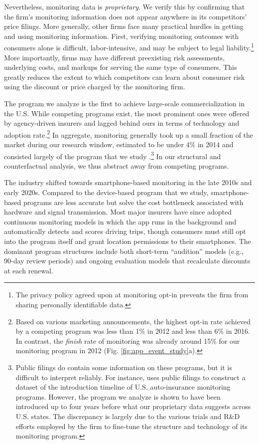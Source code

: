 Nevertheless, monitoring data is \emph{proprietary}. We verify this by confirming that the firm's monitoring information does not appear anywhere in its competitors' price filings. More generally, other firms face many practical hurdles in getting and using monitoring information. First, verifying monitoring outcomes with consumers alone is difficult, labor-intensive, and may be subject to legal liability.\footnote{The privacy policy agreed upon at monitoring opt-in prevents the firm from sharing personally identifiable data.} More importantly, firms may have different preexisting risk assessments, underlying costs, and markups for serving the same type of consumers. This greatly reduces the extent to which competitors can learn about consumer risk using the discount or price charged by the monitoring firm.

The program we analyze is the first to achieve large-scale commercialization in the U.S. While competing programs exist, the most prominent ones were offered by agency-driven insurers and lagged behind ours in terms of technology and adoption rate.\footnote{Based on various marketing announcements, the highest opt-in rate achieved by a competing program was less than 1\% in 2012 and less than 6\% in 2016. In contrast, the \textit{finish} rate of monitoring was already around 15\% for our monitoring program in 2012 (Fig. \ref{fig:app_event_study}a).} In aggregate, monitoring generally took up a small fraction of the market during our research window, estimated to be under 4\% in 2014 and consisted largely of the program that we study \parencite{ptolemus2016}.\footnote{Public filings do contain some information on these programs, but it is difficult to interpret reliably. For instance, \textcite{reimers2019impacts} uses public filings to construct a dataset of the introduction timeline of U.S. auto-insurance monitoring programs. However, the program we analyze is shown to have been introduced up to four years before what our proprietary data suggests across U.S. states.
The discrepancy is largely due to the various trials and R\&D efforts employed by the firm to fine-tune the structure and technology of its monitoring program.}
In our structural and counterfactual analysis, we thus abstract away from competing programs.

The industry shifted towards smartphone-based monitoring in the late 2010s and early 2020s. Compared to the device-based program that we study, smartphone-based programs are less accurate but solve the cost bottleneck associated with hardware and signal transmission. Most major insurers have since adopted continuous monitoring models in which the app runs in the background and automatically detects and scores driving trips, though consumers must still opt into the program itself and grant location permissions to their smartphones. The dominant program structures include both short-term ``audition'' models (e.g., 90-day review periods) and ongoing evaluation models that recalculate discounts at each renewal.

